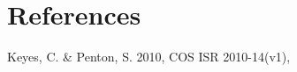 \section{References}

\vspace{-0.23cm} \noindent Keyes, C. \& Penton, S. 2010, COS ISR 2010-14(v1), 